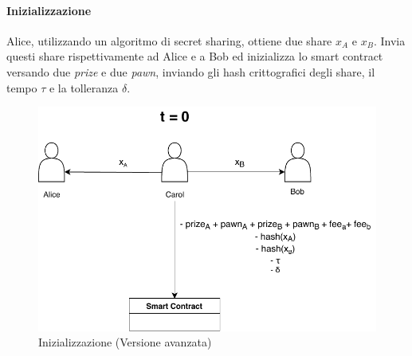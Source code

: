 \paragraph{Inizializzazione}
Alice, utilizzando un algoritmo di secret sharing, ottiene due share
$ x_A $ e $ x_B $. Invia questi share rispettivamente ad Alice e a Bob ed inizializza
lo smart contract versando due \textit{prize} e due \textit{pawn},
inviando gli hash crittografici
degli share, il tempo $ \tau $ e la tolleranza $ \delta $.
\begin{figure}[H]
	\centering
	\includegraphics[width=0.6\linewidth]{images/chap_protocollo/avanzato-creazione.pdf}
	\caption{Inizializzazione (Versione avanzata)}
\end{figure}



